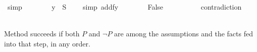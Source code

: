 \begin{isabellebody}
\ simp\isanewline
\ \ \ \ \ \ \isamarkupfalse%
\ {\isachardoublequote}y\ {\isasymin}\ {\isacharquery}S{\isachardoublequote}\ \ \ \ \isamarkupfalse%
simp\ add{\isacharcolon}fy{\isacharparenright}\isanewline
\ \ \ \ \ \ \isamarkupfalse%
\ False\ \ \ \ \ \ \ \ \ \isamarkupfalse%
\ contradiction\isanewline
\ \ \ \ \isamarkupfalse%
\isanewline
\ \ \isamarkupfalse%
\isanewline
\isamarkupfalse%
%
\endisatagproof
{\isafoldproof}%
%
\isadelimproof
%
\endisadelimproof
\isamarkuptrue%
%
\begin{isamarkuptext}%
\noindent Method  succeeds if both $P$ and
$\neg P$ are among the assumptions and the facts fed into that step, in any order.


\end{isamarkuptext}
\end{isabellebody}
